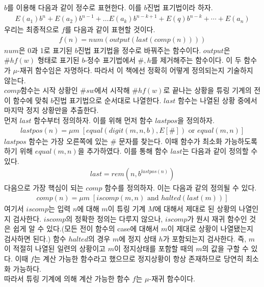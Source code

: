\documentclass[b5paper, 11pt]{book}
\theoremstyle{definition}
\newenvironment{pf*}{\pushQED{\qed}\pf}
{\popQED\endpf}
\begin{document}
\begin{pf*}
    $b$를 이용해 다음과 같이 정수로 표현한다. 이를 $b$진법 표기법이라 하자. 
    \begin{align*}
        E(a_1)b^n + E(a_2)b^{n-1} + \ldots E(a_k)b^{n-k+1} + E(q)b^{n-k} + \cdots + E(a_n)
    \end{align*}
    우리는 최종적으로 $f$를 다음과 같이 표현할 것이다.
    \begin{align*}
        f(n) = num(output(last(comp(n))))
    \end{align*}
    $num$은 0과 1로 표기된 $b$진법 표기법을 정수로 바꿔주는 함수이다. 
    $output$은 $\# h f(w)$ 형태로 표기된 $b$-정수 표기법에서 $\#, h$를 제거해주는 함수이다.
    이 두 함수가 $\mu$-재귀 함수임은 자명하다. 따라서 이 책에선 정확히 어떻게 정의되는지 기술하지 않는다.\\ 
    $comp$함수는 시작 상황인 $\# s w$에서 시작해 $\# h f(w)$로 끝나는 상황을 튜링 기계의 
    전이 함수에 맞춰 $b$진법 표기법으로 순서대로 나열한다. $last$ 함수는 나열된 상황 중에서 마지막 정지 상황만을
    추출한다. \\ 
    먼저 $last$ 함수부터 정의하자. 이를 위해 먼저 함수 $lastpos$을 정의하자.
    \begin{align*}
        lastpos(n)= \mu m \; [equal(digit(m,n,b),E[\#]) \text{ or } equal(m,n)]
    \end{align*} 
    $lastpos$ 함수는 가장 오른쪽에 있는 $\#$ 문자를 찾는다. 이때 함수가 최소화 가능하도록 하기 위해 $equal(m,n)$을 추가하였다. 이를 통해 함수 $last$는 다음과 같이 정의할 수 있다.
    \begin{align*}
        last = rem(n,b^{lastpos(n)})
    \end{align*}
    다음으로 가장 핵심이 되는 $comp$ 함수를 정의하자. 이는 다음과 같의 정의될 수 있다.
    \begin{align*}
        comp(n) = \mu m \; [iscomp(m,n) \text{ and } halted(last(m))]
    \end{align*}
    여기서 $iscomp$는 입력 $n$에 대해 $m$이 튜링 기계 $M$에 대해서 제대로 된 상황의 나열인지 검사한다. $iscomp$의 정확한 정의는 다루지 않으나, $iscomp$가 원시 재귀 함수인 것은 쉽게 알 수 있다.(모든 전이 함수의 case에 대해서 $m$이 제대로 상황이 나열됐는지 검사하면 된다.) 함수 $halted$의 경우 $m$에 정지 상태 $h$가 포함되는지 검사한다. 즉, $m$이 적절히 나열된 일련의 상황이고 $m$이 정지상태를 포함할 때의 $m$의 값을 구할 수 있다. 이때 $f$는 계산 가능한 함수라고 했으므로 정지상황이 항상 존재하므로 당연히 최소화 가능하다. \\ 
    따라서 튜링 기계에 의해 계산 가능한 함수 $f$는 $\mu$-재귀 함수이다. 
\end{pf*}
\end{document}
